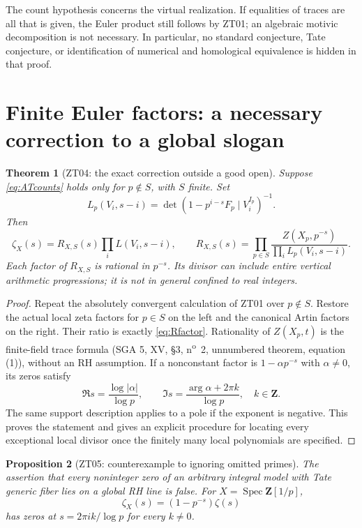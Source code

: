 \documentclass[11pt,a4paper]{article}
\newtheorem{theorem}{Theorem}[section]
\newtheorem{proposition}[theorem]{Proposition}
\theoremstyle{definition}
\begin{document}
The count hypothesis concerns the virtual realization.  If equalities
of traces are all that is given, the Euler product still follows by
ZT01; an algebraic motivic decomposition is not necessary.  In
particular, no standard conjecture, Tate conjecture, or identification
of numerical and homological equivalence is hidden in that proof.

\section{Finite Euler factors: a necessary correction to a global slogan}
\label{sec:finite-factors}

\begin{theorem}[ZT04: the exact correction outside a good open]
\label{ZT04}
Suppose \eqref{eq:ATcounts} holds only for $p\notin S$, with $S$ finite.
Set
\[
 L_p(V_i,s-i)=\det(1-p^{i-s}F_p\mid V_i^{I_p})^{-1}.
\]
Then
\begin{equation}\label{eq:Rfactor}
 \zeta_X(s)=R_{X,S}(s)\prod_i L(V_i,s-i),\qquad
 R_{X,S}(s)=\prod_{p\in S}
  \frac{Z(X_p,p^{-s})}{\prod_i L_p(V_i,s-i)}.
\end{equation}
Each factor of $R_{X,S}$ is rational in $p^{-s}$.
Its divisor can include entire vertical arithmetic progressions; it
is not in general confined to real integers.
\end{theorem}

\begin{proof}
Repeat the absolutely convergent calculation of ZT01 over $p\notin S$.
Restore the actual local zeta factors for $p\in S$ on the left and
the canonical Artin factors on the right.  Their ratio is exactly
\eqref{eq:Rfactor}.  Rationality of $Z(X_p,t)$ is the finite-field
trace formula (SGA 5, XV, \S3, n\textsuperscript{o}~2, unnumbered
theorem, equation (1)), without an RH
assumption.  If a nonconstant factor is $1-\alpha p^{-s}$ with
$\alpha\ne0$, its zeros satisfy
\[
 \Re s=\frac{\log|\alpha|}{\log p},\qquad
 \Im s=\frac{\arg\alpha+2\pi k}{\log p},\quad k\in\mathbf Z.
\]
The same support description applies to a pole if the exponent is
negative.  This proves the statement and gives an explicit procedure
for locating every exceptional local divisor once the finitely many
local polynomials are specified.
\end{proof}

\begin{proposition}[ZT05: counterexample to ignoring omitted primes]
\label{ZT05}
The assertion that every noninteger zero of an arbitrary integral
model with Tate generic fiber lies on a global RH line is false.
For $X=\operatorname{Spec}\mathbf Z[1/p]$,
\[
 \zeta_X(s)=(1-p^{-s})\zeta(s)
\]
has zeros at $s=2\pi i k/\log p$ for every $k\ne0$.
\end{proposition}
\end{document}
